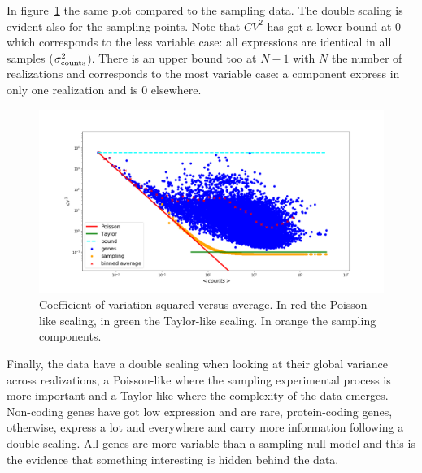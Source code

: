 In figure~\ref{fig:scalinglaws/gtex/cvmean_loglog_sampling} the same plot compared to the sampling data. The double scaling is evident also for the sampling points. Note that $CV^2$ has got a lower bound at $0$ which corresponds to the less variable case: all expressions are identical in all samples ($\sigma^2_{\mathrm{counts}}$). There is an upper bound too at $N-1$ with $N$ the number of realizations and corresponds to the most variable case: a component  express in only one realization and is $0$ elsewhere.
\begin{figure}[htb!]
    \centering
    \includegraphics[width=0.9\linewidth]{pictures/scalinglaws/gtex/cvmean_loglog_sampling.png}
    \caption{Coefficient of variation squared versus average. In \textcolor{pythonred}{red} the Poisson-like scaling, in \textcolor{pythongreen}{green} the Taylor-like scaling. In \textcolor{pythonorange}{orange} the sampling components.}
    \label{fig:scalinglaws/gtex/cvmean_loglog_sampling}
\end{figure}

Finally, the data have a double scaling when looking at their global variance across realizations, a Poisson-like where the sampling experimental process is more important and a Taylor-like where the complexity of the data emerges.
Non-coding genes have got low expression and are rare, protein-coding genes, otherwise, express a lot and everywhere and carry more information following a double scaling. All genes are more variable than a sampling null model and this is the evidence that something interesting is hidden behind the data.
